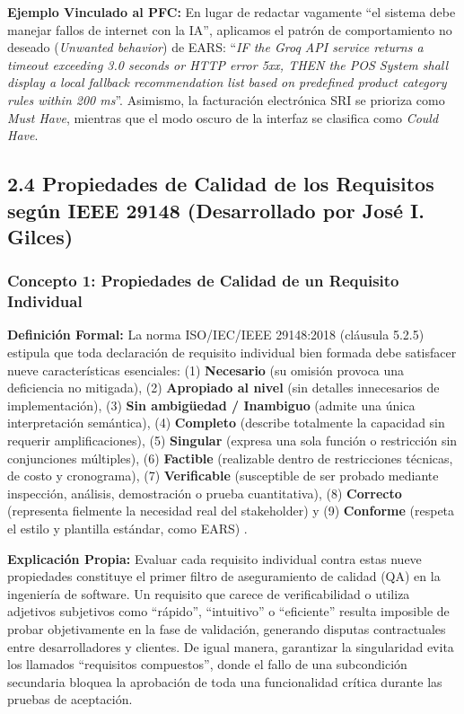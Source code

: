 \textbf{Ejemplo Vinculado al PFC:} En lugar de redactar vagamente ``el sistema debe manejar fallos de internet con la IA'', aplicamos el patrón de comportamiento no deseado (\textit{Unwanted behavior}) de EARS: ``\textit{IF the Groq API service returns a timeout exceeding 3.0 seconds or HTTP error 5xx, THEN the POS System shall display a local fallback recommendation list based on predefined product category rules within 200 ms}''. Asimismo, la facturación electrónica SRI se prioriza como \textit{Must Have}, mientras que el modo oscuro de la interfaz se clasifica como \textit{Could Have}.

\subsection{2.4 Propiedades de Calidad de los Requisitos según IEEE 29148 (Desarrollado por José I. Gilces)}

\subsubsection{Concepto 1: Propiedades de Calidad de un Requisito Individual}
\textbf{Definición Formal:} La norma ISO/IEC/IEEE 29148:2018 (cláusula 5.2.5) estipula que toda declaración de requisito individual bien formada debe satisfacer nueve características esenciales: (1) \textbf{Necesario} (su omisión provoca una deficiencia no mitigada), (2) \textbf{Apropiado al nivel} (sin detalles innecesarios de implementación), (3) \textbf{Sin ambigüedad / Inambiguo} (admite una única interpretación semántica), (4) \textbf{Completo} (describe totalmente la capacidad sin requerir amplificaciones), (5) \textbf{Singular} (expresa una sola función o restricción sin conjunciones múltiples), (6) \textbf{Factible} (realizable dentro de restricciones técnicas, de costo y cronograma), (7) \textbf{Verificable} (susceptible de ser probado mediante inspección, análisis, demostración o prueba cuantitativa), (8) \textbf{Correcto} (representa fielmente la necesidad real del stakeholder) y (9) \textbf{Conforme} (respeta el estilo y plantilla estándar, como EARS) \cite{ieee29148, pohl2025}.

\textbf{Explicación Propia:} Evaluar cada requisito individual contra estas nueve propiedades constituye el primer filtro de aseguramiento de calidad (QA) en la ingeniería de software. Un requisito que carece de verificabilidad o utiliza adjetivos subjetivos como ``rápido'', ``intuitivo'' o ``eficiente'' resulta imposible de probar objetivamente en la fase de validación, generando disputas contractuales entre desarrolladores y clientes. De igual manera, garantizar la singularidad evita los llamados ``requisitos compuestos'', donde el fallo de una subcondición secundaria bloquea la aprobación de toda una funcionalidad crítica durante las pruebas de aceptación.

